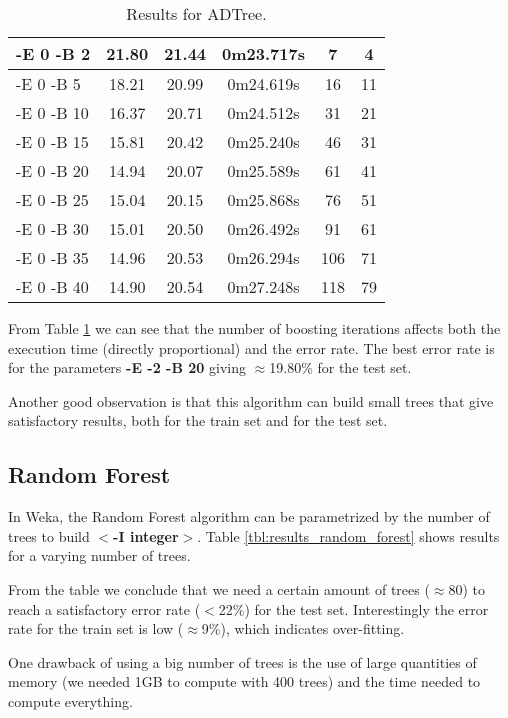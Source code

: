\documentclass[a4paper]{llncs}
\begin{document}
\begin{table}[ht]
\begin{center}
\begin{tabular}{ | l | c | c | c | c | c |}
    -E 0 -B 2 & 21.80 & 21.44 & 0m23.717s & 7 & 4 \\ \hline
    -E 0 -B 5 & 18.21 & 20.99 & 0m24.619s & 16 & 11 \\ \hline
    -E 0 -B 10 & 16.37 & 20.71 & 0m24.512s & 31 & 21 \\ \hline
    -E 0 -B 15 & 15.81 & 20.42 & 0m25.240s & 46 & 31 \\ \hline
    -E 0 -B 20 & 14.94 & 20.07 & 0m25.589s & 61 & 41 \\ \hline
    -E 0 -B 25 & 15.04 & 20.15 & 0m25.868s & 76 & 51 \\ \hline
    -E 0 -B 30 & 15.01 & 20.50 & 0m26.492s & 91 & 61 \\ \hline
    -E 0 -B 35 & 14.96 & 20.53 & 0m26.294s & 106 & 71 \\ \hline
    -E 0 -B 40 & 14.90 & 20.54 & 0m27.248s & 118 & 79 \\ \hline
    
  \end{tabular}
  \caption{Results for ADTree.}
  \label{tbl:results_adtree}
  \end{center}
\end{table}

From Table \ref{tbl:results_adtree} we can see that the number of boosting iterations affects
both the execution time (directly proportional) and the error rate.
The best error rate is for the parameters \textbf{-E -2 -B 20} giving $\approx$19.80\% for the test set.

Another good observation is that this algorithm can build small trees that give satisfactory results, both for
the train set and for the test set.

\subsection{Random Forest}

In Weka, the Random Forest algorithm can be parametrized by the number
of trees to build \textbf{$<$-I integer$>$}. Table \ref{tbl:results_random_forest} shows results for
a varying number of trees.

From the table we conclude that we need a certain amount of trees ($\approx$80) to
reach a satisfactory error rate ($<$22\%) for the test set. Interestingly
the error rate for the train set is low ($\approx$9\%), which indicates over-fitting.

One drawback of using a big number of trees is the use of large
quantities of memory (we needed 1GB to compute with 400 trees) and the time needed to compute everything.
\end{document}
